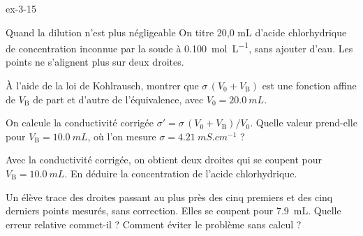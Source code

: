 \begin{blocLivre}{ex-3-15}
\begin{exercice}[3]{Quand la dilution n'est plus négligeable}
On titre 20,0 mL d'acide chlorhydrique de concentration inconnue par la soude à \qty{0,100}{mol.L^{-1}}, sans ajouter
d'eau. Les points ne s'alignent plus sur deux droites.
\begin{questions}
\item À l'aide de la loi de Kohlrausch, montrer que $\sigma\,(V_0+V_\mathrm{B})$ est une fonction affine de $V_\mathrm{B}$
de part et d'autre de l'équivalence, avec $V_0=\qty{20,0}{mL}$.
\item {}On calcule la conductivité corrigée $\sigma'=\sigma\,(V_0+V_\mathrm{B})/V_0$.
Quelle valeur prend-elle pour $V_\mathrm{B}=\qty{10,0}{mL}$, où l'on mesure $\sigma=\qty{4,21}{mS.cm^{-1}}$ ?
\item Avec la conductivité corrigée, on obtient deux droites qui se coupent pour $V_\mathrm{B}=\qty{10,0}{mL}$.
En déduire la concentration de l'acide chlorhydrique.
\item \initiative Un élève trace des droites passant au plus près des cinq premiers et des cinq derniers points mesurés,
sans correction. Elles se coupent pour \qty{7,9}{mL}. Quelle erreur relative commet-il ? Comment éviter le problème
sans calcul ?
\end{questions}
\end{exercice}
\end{blocLivre}
